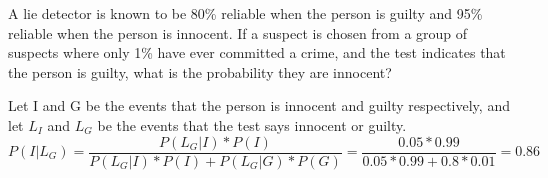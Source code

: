 \question A lie detector is known to be 80\% reliable when the person 
is guilty and 95\% reliable when the person is innocent. If a suspect 
is chosen from a group of suspects where only 1\% have ever committed 
a crime, and the test indicates that the person is guilty, what is the 
probability they are innocent?
\begin{solution}[2 cm]
Let I and G be the events that the person is innocent and guilty 
respectively, and let $L_I$ and $L_G$ be the events that the test 
says innocent or guilty. 
\[P(I | L_G) = 
\frac{P(L_G | I)*P(I)}{ 
 P(L_G | I)*P(I) + P(L_G | G)*P(G) } = \frac{0.05*0.99}{0.05*0.99 + 0.8*0.01} = 0.86\]
 \end{solution}